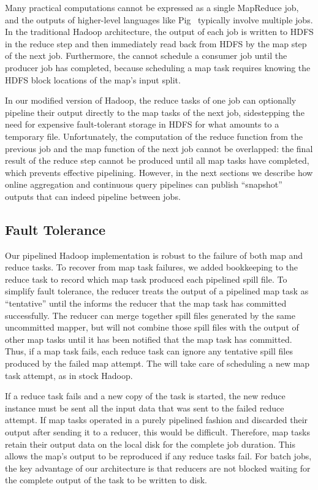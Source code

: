 Many practical computations cannot be expressed as a single MapReduce job, and
the outputs of higher-level languages like Pig~\cite{pig} typically involve
multiple jobs.  In the traditional Hadoop architecture, the output of each job
is written to HDFS in the reduce step and then immediately read back from HDFS
by the map step of the next job. Furthermore, the {\JT} cannot schedule a
consumer job until the producer job has completed, because scheduling a map task
requires knowing the HDFS block locations of the map's input split.

In our modified version of Hadoop, the reduce tasks of one job can optionally
pipeline their output directly to the map tasks of the next job, sidestepping
the need for expensive fault-tolerant storage in HDFS for what amounts to a
temporary file. Unfortunately, the computation of the reduce function from the
previous job and the map function of the next job cannot be overlapped: the
final result of the reduce step cannot be produced until all map tasks have
completed, which prevents effective pipelining. However, in the next sections we
describe how online aggregation and continuous query pipelines can publish
``snapshot'' outputs that can indeed pipeline between jobs.

\subsection{Fault Tolerance}
\label{sec:ft}


Our pipelined Hadoop implementation is robust to the failure of both
map and reduce tasks. To recover from map task failures, we added
bookkeeping to the reduce task to record which map task produced each
pipelined spill file. To simplify fault tolerance, the reducer treats
the output of a pipelined map task as ``tentative'' until the {\JT}
informs the reducer that the map task has committed successfully. The
reducer can merge together spill files generated by the same
uncommitted mapper, but will not combine those spill files with the
output of other map tasks until it has been notified that the map task
has committed. Thus, if a map task fails, each reduce task can ignore
any tentative spill files produced by the failed map attempt. The
{\JT} will take care of scheduling a new map task attempt, as in stock
Hadoop. 

If a reduce task fails and a new copy of the task is started, the new
reduce instance must be sent all the input data that was sent to the
failed reduce attempt. If map tasks operated in a purely pipelined
fashion and discarded their output after sending it to a reducer, this
would be difficult. Therefore, map tasks retain their output data on
the local disk for the complete job duration. This allows the map's output to be 
reproduced if any reduce tasks fail. For batch jobs, the key advantage of our architecture is
that reducers are not blocked waiting for the complete output of the
task to be written to disk.


